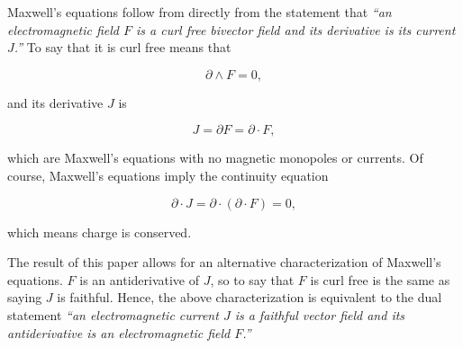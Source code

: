 \documentclass[twocolumn]{article}
\begin{document}
Maxwell's equations follow from directly from the statement that \emph{``an electromagnetic field $F$ is a curl free bivector field and its derivative is its current $J$.''} To say that it is curl free means that

\begin{equation}
  \partial \wedge F = 0,
\end{equation}

and its derivative $J$ is

\begin{equation}
  J = \partial F = \partial \cdot F,
\end{equation} 

which are Maxwell's equations with no magnetic monopoles or currents. Of course, Maxwell's equations imply the continuity equation

\begin{equation}
  \partial \cdot J = \partial \cdot (\partial \cdot F) = 0, \label{eq:continuity}
\end{equation} 

which means charge is conserved. 

The result of this paper allows for an alternative characterization of Maxwell's equations. $F$ is an antiderivative of $J$, so to say that $F$ is curl free is the same as saying $J$ is faithful. Hence, the above characterization is equivalent to the dual statement \emph{``an electromagnetic current $J$ is a faithful vector field and its antiderivative is an electromagnetic field $F$.''}





\end{document}
